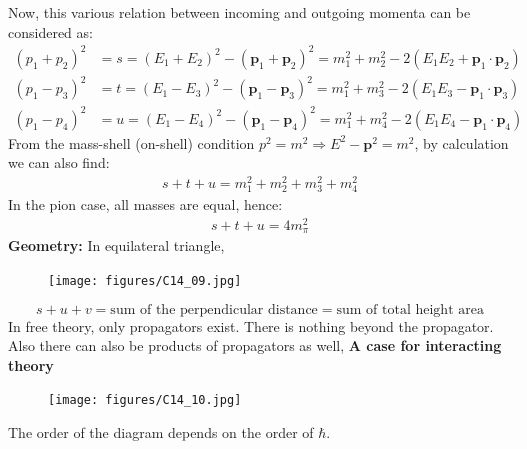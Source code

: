 \documentclass[14pt]{article} %
\begin{document}
Now, this various relation between incoming and outgoing momenta can be considered as:
\begin{align*}
(p_1 + p_2)^2 &= s = (E_1 + E_2)^2 - (\mathbf{p}_1 + \mathbf{p}_2)^2 
= m_1^2 + m_2^2 - 2(E_1 E_2 + \mathbf{p}_1 \cdot \mathbf{p}_2) \\
(p_1 - p_3)^2 &= t = (E_1 - E_3)^2 - (\mathbf{p}_1 - \mathbf{p}_3)^2 
= m_1^2 + m_3^2 - 2(E_1 E_3 - \mathbf{p}_1 \cdot \mathbf{p}_3) \\
(p_1 - p_4)^2 &= u = (E_1 - E_4)^2 - (\mathbf{p}_1 - \mathbf{p}_4)^2
= m_1^2 + m_4^2 - 2(E_1 E_4 - \mathbf{p}_1 \cdot \mathbf{p}_4)
\end{align*}
From the mass-shell (on-shell) condition $p^2 = m^2 \Rightarrow E^2-\mathbf{p}^2=m^2$, by calculation we can also find: 
\begin{align*}
s + t + u = m_1^2 + m_2^2 + m_3^2 + m_4^2
\end{align*}
In the pion case, all masses are equal, hence:
\begin{align*}
s + t + u = 4 m_\pi^2
\end{align*}
\textbf{Geometry:} In equilateral triangle,
\begin{figure}[H]
    \centering
    \texttt{[image: figures/C14\_09.jpg]}
    \caption*{}
    \label{fig:placeholder}
\end{figure}
\vspace{-1.5cm}
\[
s+u+v = \text{sum of the perpendicular distance} = \text{sum of total height area}
\]
In free theory, only propagators exist. There is nothing beyond the propagator. Also there can also be products of propagators as well,
\newpage
\noindent
\textbf{A case for interacting theory}
\begin{figure}[H]
    \centering
    \texttt{[image: figures/C14\_10.jpg]}
    \caption*{}
    \label{fig:placeholder}
\end{figure}
\vspace{-1cm}
The order of the diagram depends on the order of $\hbar$.
\end{document}

